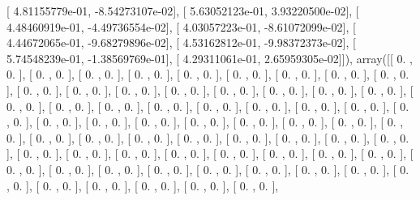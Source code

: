 \documentclass{article}
\begin{document}
       [  4.81155779e-01,  -8.54273107e-02],
       [  5.63052123e-01,   3.93220500e-02],
       [  4.48460919e-01,  -4.49736554e-02],
       [  4.03057223e-01,  -8.61072099e-02],
       [  4.44672065e-01,  -9.68279896e-02],
       [  4.53162812e-01,  -9.98372373e-02],
       [  5.74548239e-01,  -1.38569769e-01],
       [  4.29311061e-01,   2.65959305e-02]]), array([[ 0.        ,  0.        ],
       [ 0.        ,  0.        ],
       [ 0.        ,  0.        ],
       [ 0.        ,  0.        ],
       [ 0.        ,  0.        ],
       [ 0.        ,  0.        ],
       [ 0.        ,  0.        ],
       [ 0.        ,  0.        ],
       [ 0.        ,  0.        ],
       [ 0.        ,  0.        ],
       [ 0.        ,  0.        ],
       [ 0.        ,  0.        ],
       [ 0.        ,  0.        ],
       [ 0.        ,  0.        ],
       [ 0.        ,  0.        ],
       [ 0.        ,  0.        ],
       [ 0.        ,  0.        ],
       [ 0.        ,  0.        ],
       [ 0.        ,  0.        ],
       [ 0.        ,  0.        ],
       [ 0.        ,  0.        ],
       [ 0.        ,  0.        ],
       [ 0.        ,  0.        ],
       [ 0.        ,  0.        ],
       [ 0.        ,  0.        ],
       [ 0.        ,  0.        ],
       [ 0.        ,  0.        ],
       [ 0.        ,  0.        ],
       [ 0.        ,  0.        ],
       [ 0.        ,  0.        ],
       [ 0.        ,  0.        ],
       [ 0.        ,  0.        ],
       [ 0.        ,  0.        ],
       [ 0.        ,  0.        ],
       [ 0.        ,  0.        ],
       [ 0.        ,  0.        ],
       [ 0.        ,  0.        ],
       [ 0.        ,  0.        ],
       [ 0.        ,  0.        ],
       [ 0.        ,  0.        ],
       [ 0.        ,  0.        ],
       [ 0.        ,  0.        ],
       [ 0.        ,  0.        ],
       [ 0.        ,  0.        ],
       [ 0.        ,  0.        ],
       [ 0.        ,  0.        ],
       [ 0.        ,  0.        ],
       [ 0.        ,  0.        ],
       [ 0.        ,  0.        ],
       [ 0.        ,  0.        ],
       [ 0.        ,  0.        ],
       [ 0.        ,  0.        ],
       [ 0.        ,  0.        ],
       [ 0.        ,  0.        ],
       [ 0.        ,  0.        ],
       [ 0.        ,  0.        ],
       [ 0.        ,  0.        ],
       [ 0.        ,  0.        ],
       [ 0.        ,  0.        ],
       [ 0.        ,  0.        ],
       [ 0.        ,  0.        ],
       [ 0.        ,  0.        ],
       [ 0.        ,  0.        ],
       [ 0.        ,  0.        ],
\end{document}
